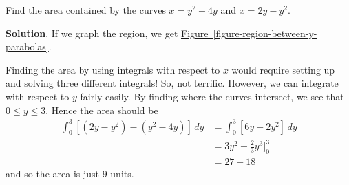 \documentclass[10pt,]{book}
\theoremstyle{ptxplainnotitle}
\theoremstyle{ptxplaintitle}
\theoremstyle{ptxplainnotitle}
\theoremstyle{ptxplaintitle}
\theoremstyle{ptxplainnotitle}
\theoremstyle{ptxplaintitle}
\theoremstyle{ptxdefinitionnotitle}
\theoremstyle{ptxdefinitiontitle}
\theoremstyle{ptxdefinitionnotitle}
\theoremstyle{ptxdefinitiontitle}
\theoremstyle{ptxdefinitionnotitle}
\theoremstyle{ptxdefinitiontitle}
\theoremstyle{ptxdefinitionnotitle}
\theoremstyle{ptxdefinitiontitle}
\theoremstyle{ptxdefinitionnotitle}
\theoremstyle{ptxdefinitiontitle}
\numberwithin{equation}{section}
\begin{document}
\begin{example}\label{example-140}
\hypertarget{p-624}{}%
Find the area contained by the curves \(x = y^{2} - 4y\) and \(x = 2y - y^{2}\).%
\par\smallskip%
\noindent\textbf{Solution}.\hypertarget{solution-136}{}\quad%
\hypertarget{p-625}{}%
If we graph the region, we get \hyperref[figure-region-between-y-parabolas]{Figure~\ref{figure-region-between-y-parabolas}}.%
\begin{figure}
\centering
{
}
\end{figure}
\hypertarget{p-626}{}%
Finding the area by using integrals with respect to \(x\) would require setting up and solving three different integrals! So, not terrific. However, we can integrate with respect to \(y\) fairly easily. By finding where the curves intersect, we see that \(0\leq y\leq 3\). Hence the area should be%
\begin{align*}
\int_{0}^{3}[(2y - y^{2}) - (y^{2} - 4y)]\,dy & = \int_{0}^{3}[6y - 2y^{2}]\,dy \\
& = 3y^{2} - \frac{2}{3}y^{3}\Bigg]_{0}^{3} \\
& = 27 - 18 
\end{align*}
and so the area is just \(9\) units.%
\end{example}
\typeout{************************************************}
\typeout{************************************************}
\end{document}
